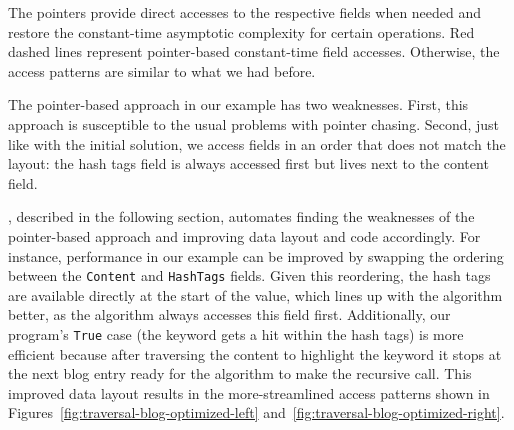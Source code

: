 
The pointers provide direct accesses to the respective fields when needed and
restore the constant-time asymptotic complexity for certain operations.
Red dashed lines represent pointer-based constant-time field accesses.
%
Otherwise, the access patterns are similar to what we had before.

The pointer-based approach in our example has two weaknesses. First, this
approach is susceptible to the usual problems with pointer chasing. Second, just
like with the initial solution, we access fields in an order that does not match
the layout: the hash tags field is always accessed first but lives next to the
content field. 

\system, described in the following section, automates finding
the weaknesses of the pointer-based approach and improving data layout and code accordingly.
For instance, performance in our example can be improved by swapping the
ordering between the \lstinline|Content| and \lstinline|HashTags| fields.
%
Given this reordering, the hash tags are available directly at the start of the
value, which lines up with the algorithm better, as the algorithm always
accesses this field first.
%
Additionally, our program's \lstinline|True| case (the keyword gets a hit within the
hash tags) is more efficient because after traversing the content to highlight
the keyword it stops at the next blog entry ready for the algorithm to make
the recursive call.
%
This improved data layout results in the more-streamlined access patterns shown in Figures~\ref{fig:traversal-blog-optimized-left} and~\ref{fig:traversal-blog-optimized-right}.
%

